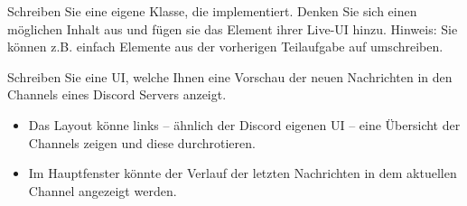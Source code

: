 \documentclass{ubo_tex_uebungszettel/uebungszettel}
\theoremstyle{definition}
\newcommand{\pp}[1]{\lpl{#1}}
\begin{document}
\begin{aufg}[Rich]
			  \noindent Schreiben Sie eine eigene Klasse, die \pp{__rich__} implementiert. Denken Sie sich einen möglichen Inhalt aus und fügen sie das Element ihrer Live-UI hinzu.\newline
			  Hinweis: Sie können z.B. einfach Elemente aus der vorherigen Teilaufgabe auf \pp{__rich__} umschreiben.
			  
			  	\medskip
			  \medskip
			  
			  \noindent {} \quad
			  
			  \noindent Schreiben Sie eine UI, welche Ihnen eine Vorschau der neuen Nachrichten in den Channels eines Discord Servers anzeigt.
			  \begin{itemize}
			  	\item Das Layout könne links -- ähnlich der Discord eigenen UI -- eine Übersicht der Channels zeigen und diese \glqq durchrotieren\grqq.
			  	\item Im Hauptfenster könnte der Verlauf der letzten Nachrichten in dem aktuellen Channel angezeigt werden.
			  \end{itemize}
			  
			  
			  
		\end{aufg}
	
\end{document}
